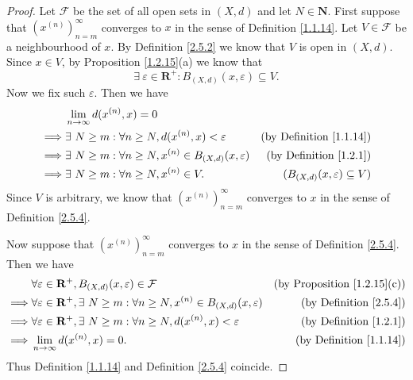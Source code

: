 \begin{proof}
    Let \(\mathcal{F}\) be the set of all open sets in \((X, d)\) and let \(N \in \mathbf{N}\).
    First suppose that \((x^{(n)})_{n = m}^\infty\) converges to \(x\) in the sense of Definition \ref{1.1.14}.
    Let \(V \in \mathcal{F}\) be a neighbourhood of \(x\).
    By Definition \ref{2.5.2} we know that \(V\) is open in \((X, d)\).
    Since \(x \in V\), by Proposition \ref{1.2.15}(a) we know that
    \[
        \exists\ \varepsilon \in \mathbf{R}^+ : B_{(X, d)}(x, \varepsilon) \subseteq V.
    \]
    Now we fix such \(\varepsilon\).
    Then we have
    \begin{align*}
                 & \lim_{n \to \infty} d(x^{(n)}, x) = 0                                                                                   \\
        \implies & \exists\ N \geq m : \forall n \geq N, d(x^{(n)}, x) < \varepsilon            & \text{(by Definition \ref{1.1.14})}      \\
        \implies & \exists\ N \geq m : \forall n \geq N, x^{(n)} \in B_{(X, d)}(x, \varepsilon) & \text{(by Definition \ref{1.2.1})}       \\
        \implies & \exists\ N \geq m : \forall n \geq N, x^{(n)} \in V.                         & (B_{(X, d)}(x, \varepsilon) \subseteq V)
    \end{align*}
    Since \(V\) is arbitrary, we know that \((x^{(n)})_{n = m}^\infty\) converges to \(x\) in the sense of Definition \ref{2.5.4}.

    Now suppose that \((x^{(n)})_{n = m}^\infty\) converges to \(x\) in the sense of Definition \ref{2.5.4}.
    Then we have
    \begin{align*}
                 & \forall \varepsilon \in \mathbf{R}^+, B_{(X, d)}(x, \varepsilon) \in \mathcal{F}                                   & \text{(by Proposition \ref{1.2.15}(c))} \\
        \implies & \forall \varepsilon \in \mathbf{R}^+, \exists\ N \geq m : \forall n \geq N, x^{(n)} \in B_{(X, d)}(x, \varepsilon) & \text{(by Definition \ref{2.5.4})}      \\
        \implies & \forall \varepsilon \in \mathbf{R}^+, \exists\ N \geq m : \forall n \geq N, d(x^{(n)}, x) < \varepsilon            & \text{(by Definition \ref{1.2.1})}      \\
        \implies & \lim_{n \to \infty} d(x^{(n)}, x) = 0.                                                                             & \text{(by Definition \ref{1.1.14})}
    \end{align*}
    Thus Definition \ref{1.1.14} and Definition \ref{2.5.4} coincide.
\end{proof}

